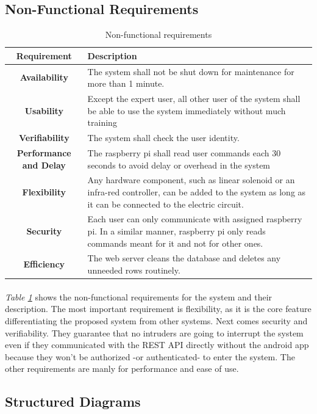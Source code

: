 \documentclass[12pt, oneside, a4paper]{book}
\newcommand\boldcolor[1]{\textcolor{bold}{\textbf{#1}}}
\begin{document}
			\newpage\subsection{Non-Functional Requirements}
				\def\arraystretch{1.5}
				\begin{table}[H]
					\begin{center}
						\begin{tabularx}{\linewidth}{|c|X|}\hline
							\boldcolor{Requirement} & \boldcolor{Description}\\\hline
							\textbf{Availability} & The system shall not be shut down for maintenance for more than 1 minute. \\\hline
							\textbf{Usability} & Except the expert user, all other user of the system shall be able to use the system immediately without much training  \\\hline
							\textbf{Verifiability} & The system shall check the user identity. \\\hline
							\textbf{Performance and Delay} & The raspberry pi shall read user commands each 30 seconds to avoid delay or overhead in the system\\\hline
							\textbf{Flexibility} & Any hardware component, such as linear solenoid or an infra-red controller, can be added to the system as long as it can be connected to the electric circuit.  \\\hline
							\textbf{Security} & Each user can only communicate with assigned raspberry pi. In a similar manner, raspberry pi only reads commands meant for it and not for other ones.  \\\hline
							\textbf{Efficiency} & The web server cleans the database and deletes any unneeded rows routinely.  \\\hline
						\end{tabularx}
					\end{center}
					\caption{Non-functional requirements}
					\label{table:non-func}
				\end{table}
			\paragraph{} \textit{Table \ref{table:non-func}} shows the non-functional requirements for the system and their description. The most important requirement is flexibility, as it is the core feature differentiating the proposed system from other systems. Next comes security and verifiability. They guarantee that no intruders are going to interrupt the system even if they communicated with the REST API directly without the android app because they won't be authorized -or authenticated- to enter the system. The other requirements are manly for performance and ease of use. 
			\newpage\subsection{Structured Diagrams}
\end{document}
